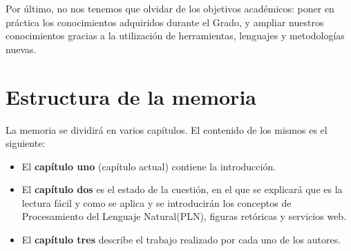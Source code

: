 Por último, no nos tenemos que olvidar de los objetivos académicos: poner en práctica los conocimientos adquiridos durante el Grado, y ampliar nuestros conocimientos gracias a la utilización de herramientas, lenguajes y metodologías nuevas.
	
\section{Estructura de la memoria}

La memoria se dividirá en varios capítulos. El contenido de los mismos es el siguiente:
\begin{itemize}
	\item El \textbf{capítulo uno} (capítulo actual) contiene la introducción.
	\item El \textbf{capítulo dos} es el estado de la cuestión, en el que se explicará que es la lectura fácil y como se aplica y se introducirán los conceptos de Procesamiento del Lenguaje Natural(PLN), figuras retóricas y servicios web.
	\item El \textbf{capítulo tres} describe el trabajo realizado por cada uno de los autores.
\end{itemize}